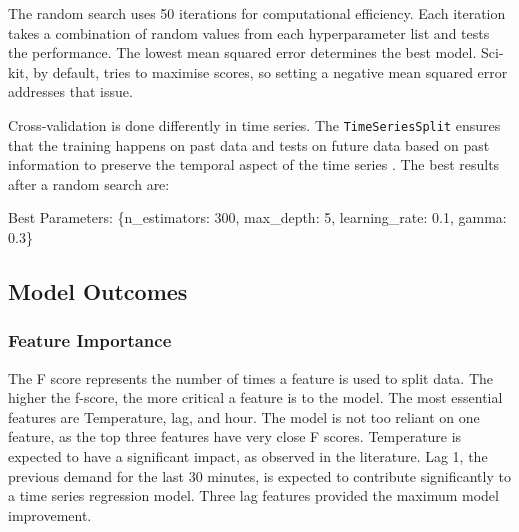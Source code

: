 \documentclass[mstat,12pt]{unswthesis}
\newenvironment{Shaded}{\begin{snugshade}}{\end{snugshade}}
\newcommand{\DecValTok}[1]{\textcolor[rgb]{0.00,0.00,0.81}{#1}}
\newcommand{\FloatTok}[1]{\textcolor[rgb]{0.00,0.00,0.81}{#1}}
\newcommand{\NormalTok}[1]{#1}
\newcommand{\StringTok}[1]{\textcolor[rgb]{0.31,0.60,0.02}{#1}}
\begin{document}
The random search uses 50 iterations for computational efficiency. Each
iteration takes a combination of random values from each hyperparameter
list and tests the performance. The lowest mean squared error determines
the best model. Sci-kit, by default, tries to maximise scores, so
setting a negative mean squared error addresses that issue.

Cross-validation is done differently in time series. The
\texttt{TimeSeriesSplit} ensures that the training happens on past data
and tests on future data based on past information to preserve the
temporal aspect of the time series \cite{scikit-learn2024}. The best
results after a random search are:

\begin{Shaded}
\begin{Highlighting}[]
\NormalTok{Best Parameters: \{}\StringTok{\textquotesingle{}n\_estimators\textquotesingle{}}\NormalTok{: }\DecValTok{300}\NormalTok{, }
                  \StringTok{\textquotesingle{}max\_depth\textquotesingle{}}\NormalTok{: }\DecValTok{5}\NormalTok{, }
                  \StringTok{\textquotesingle{}learning\_rate\textquotesingle{}}\NormalTok{: }\FloatTok{0.1}\NormalTok{, }
                  \StringTok{\textquotesingle{}gamma\textquotesingle{}}\NormalTok{: }\FloatTok{0.3}\NormalTok{\}}
\end{Highlighting}
\end{Shaded}

\subsection{Model Outcomes}\label{model-outcomes}

\subsubsection{Feature Importance}\label{feature-importance}

The F score represents the number of times a feature is used to split
data. The higher the f-score, the more critical a feature is to the
model. The most essential features are Temperature, lag, and hour. The
model is not too reliant on one feature, as the top three features have
very close F scores. Temperature is expected to have a significant
impact, as observed in the literature. Lag 1, the previous demand for
the last 30 minutes, is expected to contribute significantly to a time
series regression model. Three lag features provided the maximum model
improvement.
\end{document}
